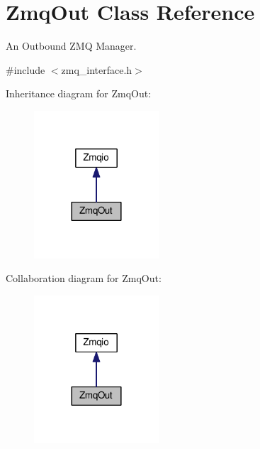 \hypertarget{classZmqOut}{}\section{Zmq\+Out Class Reference}
\label{classZmqOut}


An Outbound Z\+MQ Manager.  




{\ttfamily \#include $<$zmq\+\_\+interface.\+h$>$}



Inheritance diagram for Zmq\+Out\+:\nopagebreak
\begin{figure}[H]
\begin{center}
\leavevmode
\includegraphics[width=132pt]{classZmqOut__inherit__graph}
\end{center}
\end{figure}


Collaboration diagram for Zmq\+Out\+:\nopagebreak
\begin{figure}[H]
\begin{center}
\leavevmode
\includegraphics[width=132pt]{classZmqOut__coll__graph}
\end{center}
\end{figure}
